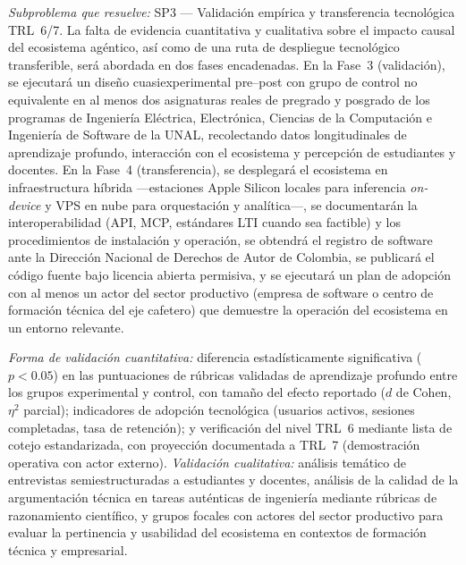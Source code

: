 \begin{enumerate}[leftmargin=*, itemsep=12pt]
    \textit{Subproblema que resuelve:} SP3 — Validación empírica y transferencia tecnológica
    TRL~6/7. La falta de evidencia cuantitativa y cualitativa sobre el impacto causal del
    ecosistema agéntico, así como de una ruta de despliegue tecnológico transferible, será
    abordada en dos fases encadenadas. En la Fase~3 (validación), se ejecutará un diseño
    cuasiexperimental pre--post con grupo de control no equivalente en al menos dos asignaturas
    reales de pregrado y posgrado de los programas de Ingeniería Eléctrica, Electrónica, Ciencias
    de la Computación e Ingeniería de Software de la UNAL, recolectando datos longitudinales de
    aprendizaje profundo, interacción con el ecosistema y percepción de estudiantes y docentes.
    En la Fase~4 (transferencia), se desplegará el ecosistema en infraestructura híbrida
    —estaciones Apple Silicon locales para inferencia \emph{on-device} y VPS en nube para
    orquestación y analítica—, se documentarán la interoperabilidad (API, MCP, estándares LTI
    cuando sea factible) y los procedimientos de instalación y operación, se obtendrá el registro
    de software ante la Dirección Nacional de Derechos de Autor de Colombia, se publicará el
    código fuente bajo licencia abierta permisiva, y se ejecutará un plan de adopción con al
    menos un actor del sector productivo (empresa de software o centro de formación técnica del
    eje cafetero) que demuestre la operación del ecosistema en un entorno relevante.

    \textit{Forma de validación cuantitativa:} diferencia estadísticamente significativa
    ($p<0.05$) en las puntuaciones de rúbricas validadas de aprendizaje profundo entre los grupos
    experimental y control, con tamaño del efecto reportado ($d$ de Cohen, $\eta^2$ parcial);
    indicadores de adopción tecnológica (usuarios activos, sesiones completadas, tasa de
    retención); y verificación del nivel TRL~6 mediante lista de cotejo estandarizada, con
    proyección documentada a TRL~7 (demostración operativa con actor externo). \textit{Validación
    cualitativa:} análisis temático de entrevistas semiestructuradas a estudiantes y docentes,
    análisis de la calidad de la argumentación técnica en tareas auténticas de ingeniería mediante
    rúbricas de razonamiento científico, y grupos focales con actores del sector productivo para
    evaluar la pertinencia y usabilidad del ecosistema en contextos de formación técnica y
    empresarial.

\end{enumerate}
